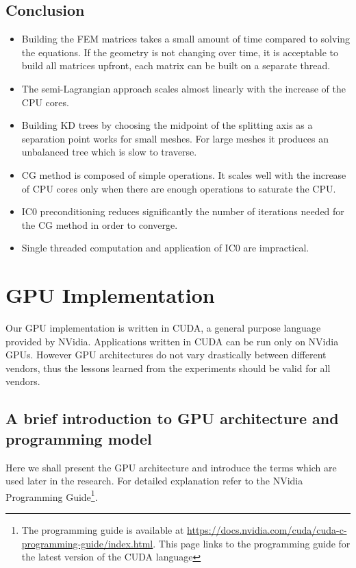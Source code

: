 \subsection{Conclusion}
\begin{itemize}
	\item Building the FEM matrices takes a small amount of time compared to solving the equations. If the geometry is not changing over time, it is acceptable to build all matrices upfront, each matrix can be built on a separate thread.
	\item The semi-Lagrangian approach scales almost linearly with the increase of the CPU cores.
	\item Building KD trees by choosing the midpoint of the splitting axis as a separation point works for small meshes. For large meshes it produces an unbalanced tree which is slow to traverse.
	\item CG method is composed of simple operations. It scales well with the increase of CPU cores only when there are enough operations to saturate the CPU.
	\item IC0 preconditioning reduces significantly the number of iterations needed for the CG method in order to converge.
	\item Single threaded computation and application of IC0 are impractical.
\end{itemize}

\section{GPU Implementation}
Our GPU implementation is written in CUDA, a general purpose language provided by NVidia. Applications written in CUDA can be run only on NVidia GPUs. However GPU architectures do not vary drastically between different vendors, thus the lessons learned from the experiments should be valid for all vendors.
\subsection{A brief introduction to GPU architecture and programming model}
Here we shall present the GPU architecture and introduce the terms which are used later in the research. For detailed explanation refer to the NVidia Programming Guide\footnote{The programming guide is available at \url{https://docs.nvidia.com/cuda/cuda-c-programming-guide/index.html}. This page links to the programming guide for the latest version of the CUDA language}.

